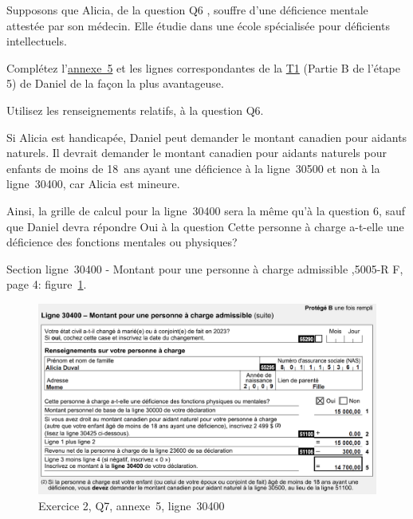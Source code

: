 \begin{question}
	Supposons que Alicia, de la question \og Q6 \fg{}, souffre d'une déficience mentale attestée par son médecin. Elle étudie dans une école spécialisée pour déficients intellectuels.
	
	Complétez l'\href{https://www.canada.ca/fr/agence-revenu/services/formulaires-publications/trousses-impot-toutes-annees-imposition/trousse-generale-impot-prestations/5000-s5.html}{annexe~5} et les lignes correspondantes de la \href{https://www.canada.ca/fr/agence-revenu/services/formulaires-publications/trousses-impot-toutes-annees-imposition/trousse-generale-impot-prestations/quebec/5005-r.html}{T1} (Partie B de l'étape 5) de Daniel de la façon la plus avantageuse. 
	
	Utilisez les renseignements relatifs, à la question Q6.
\end{question}
Si Alicia est handicapée, Daniel peut demander le montant canadien pour aidants naturels. Il devrait demander le montant canadien pour aidants naturels pour enfants de moins de 18~ans ayant une déficience à la ligne~30500 et non à la ligne~30400, car Alicia est mineure.

Ainsi, la grille de calcul pour la ligne~30400 sera la même qu'à la question 6, sauf que Daniel devra répondre \og Oui\fg{} à la question \og Cette personne à charge a-t-elle une déficience des fonctions mentales ou physiques?\fg{}

Section \og ligne~30400 - Montant pour une personne à charge admissible \fg{},5005-R F, page 4: figure~\ref{fig:chap4Exercice2Q7S5}.
\begin{figure}
	\centering
	\includegraphics[width=.9\textwidth]{exercice/4-2/Q7/30400.png}
	\caption{Exercice 2, Q7, annexe~5, ligne~30400}
	\label{fig:chap4Exercice2Q7S5}
\end{figure}

